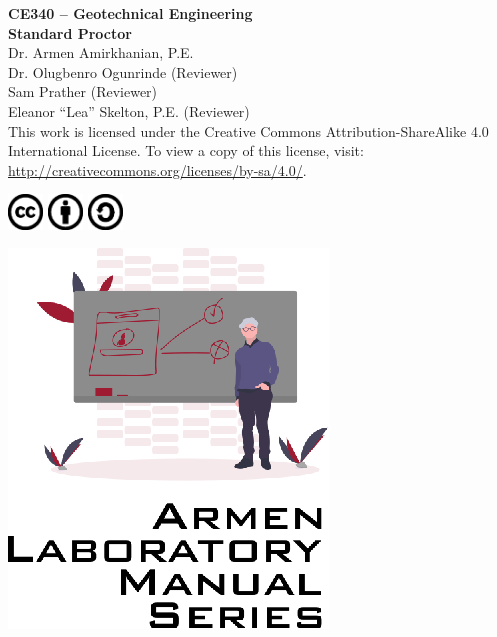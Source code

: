 \documentclass[12pt]{article}
\newcommand{\CourseNum}{CE340}
\newcommand{\CourseName}{Geotechnical Engineering}
\newcommand{\LabTitle}{Standard Proctor}
\begin{document}
\begin{titlepage}
\begin{flushright}
\LARGE{\textbf{\CourseNum{} -- \CourseName}}\\
\vfill
\Huge{\textbf{\LabTitle}}\\
    \vfill
    \large Dr. Armen Amirkhanian, P.E.\\
    \normalsize Dr. Olugbenro Ogunrinde (Reviewer)\\
    \normalsize Sam Prather (Reviewer)\\
    \normalsize Eleanor ``Lea'' Skelton, P.E. (Reviewer)\\
\vfill
\normalsize This work is licensed under the Creative Commons Attribution-ShareAlike 4.0 International License. To view a copy of this license, visit:
\href{http://creativecommons.org/licenses/by-sa/4.0/}{http://creativecommons.org/licenses/by-sa/4.0/}.

\includegraphics[width=0.07\textwidth]{cc.eps}
\includegraphics[width=0.07\textwidth]{by.eps}
\includegraphics[width=0.07\textwidth]{sa.eps}
\vfill

\includegraphics[width=0.3\linewidth]{Logo.eps}\\ 
 
  
\end{flushright}
\end{titlepage}
\end{document}
